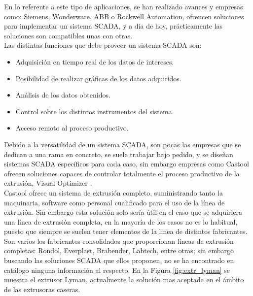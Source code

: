 En lo referente a este tipo de aplicaciones, se han realizado avances y empresas como: Siemens, Wonderware, ABB o Rockwell Automation, ofrencen soluciones para implementar un sistema SCADA, y a día de hoy, prácticamente las soluciones son compatibles unas con otras.\\

Las distintas funciones que debe proveer un sistema SCADA son:

\begin{itemize}
    \item{Adquisición en tiempo real de los datos de intereses.}
    \item{Posibilidad de realizar gráficas de los datos adquiridos.}
    \item{Análisis de los datos obtenidos.}
    \item{Control sobre los distintos instrumentos del sistema.}
    \item{Acceso remoto al proceso productivo.}
\end{itemize}

Debido a la versatilidad de un sistema SCADA, son pocas las empresas que se dedican a una rama en concreto, se suele trabajar bajo pedido, y se diseñan sistemas SCADA específicos para cada caso, sin embargo empresas como Castool ofrecen soluciones capaces de controlar totalmente el proceso productivo de la extrusión, Visual Optimizer \cite{castool}.\\

Castool ofrece un sistema de extrusión completo, suministrando tanto la maquinaria, software como personal cualificado para el uso de la línea de extrusión. Sin embargo esta solución solo sería útil en el caso que se adquiriera una línea de extrusión completa, en la mayoría de los casos no es lo habitual, puesto que siempre se suelen tener elementos de la linea de distintos fabricantes.\\

Son varios los fabricantes consolidados que proporcionan líneas de extrusión completas: Rondol, Everplast, Brabender, Labtech, entre otras; sin embargo buscando las soluciones SCADA que ellos proponen, no se ha encontrado en catálogo ninguna información al respecto. En la Figura \ref{fig:extr_lyman} se muestra el extrusor Lyman, actualmente la solución mas aceptada en el ámbito de las extrusoras caseras.

